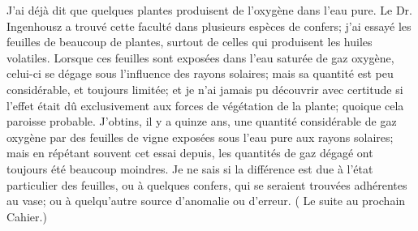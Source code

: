 J'ai déjà dit que quelques plantes produisent de l'oxygène dans l'eau pure. Le Dr. Ingenhousz a trouvé cette faculté dans plusieurs espèces de confers; j'ai essayé les feuilles de beaucoup de plantes, surtout de celles qui produisent les huiles volatiles. Lorsque ces feuilles sont exposées dans l'eau saturée de gaz oxygène, celui-ci se dégage sous l'influence des rayons solaires; mais sa quantité est peu considérable, et toujours limitée; et je n'ai jamais pu découvrir avec certitude si l'effet était dû exclusivement aux forces de végétation de la plante; quoique cela paroisse probable. J'obtins, il y a quinze ans, une quantité considérable de gaz oxygène par des feuilles de vigne exposées sous l'eau pure aux rayons solaires; mais en répétant souvent cet essai depuis, les quantités de gaz dégagé ont toujours été beaucoup moindres. Je ne sais si la différence est due à l'état particulier des feuilles, ou à quelques confers, qui se seraient trouvées adhérentes au vase; ou à quelqu'autre source d'anomalie ou d'erreur.
( Le suite au prochain Cahier.)